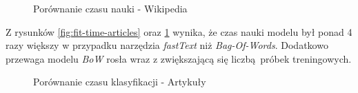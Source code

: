 \begin{figure}[ht!]
	\centering
    \qquad
	\caption{Porównanie czasu nauki - Wikipedia}
    \label{fig:fit-time-wikipedia}
\end{figure}

Z rysunków \ref{fig:fit-time-articles} oraz \ref{fig:fit-time-wikipedia} wynika, że czas nauki modelu  był ponad 4 razy większy w przypadku narzędzia \textit{fastText} niż \textit{Bag-Of-Words}. Dodatkowo przewaga modelu \textit{BoW} rosła wraz z zwiększającą się liczbą próbek treningowych. 


\begin{figure}[ht!]
	\centering
    \qquad
	\caption{Porównanie czasu klasyfikacji - Artykuły}
    \label{fig:predict-time-articles}
\end{figure}

